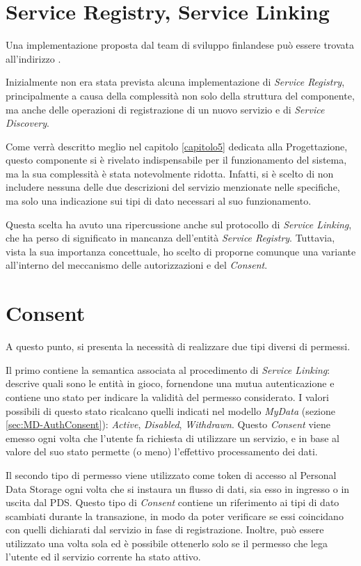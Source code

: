 \section{Service Registry, Service Linking}
Una implementazione proposta dal team di sviluppo finlandese pu\`o essere trovata all’indirizzo \cite{githubmydataserviceregistry}. 

Inizialmente non era stata prevista alcuna implementazione di \textit{Service Registry}, principalmente a causa della complessit\`a non solo della struttura del componente, ma anche delle operazioni di registrazione di un nuovo servizio e di \textit{Service Discovery}.

Come verr\`a descritto meglio nel capitolo \ref{capitolo5} dedicata alla Progettazione, questo componente si \`e rivelato indispensabile per il funzionamento del sistema, ma la sua complessit\`a \`e stata notevolmente ridotta. Infatti, si \`e scelto di non includere nessuna delle due descrizioni del servizio menzionate nelle specifiche, ma solo una indicazione sui tipi di dato necessari al suo funzionamento.

Questa scelta ha avuto una ripercussione anche sul protocollo di \textit{Service Linking}, che ha perso di significato in mancanza dell’entit\`a \textit{Service Registry}. Tuttavia, vista la sua importanza concettuale, ho scelto di proporne comunque una variante all’interno del meccanismo delle autorizzazioni e del \textit{Consent}.

\section{Consent}
\label{sec:A-Consent}
A questo punto, si presenta la necessit\`a di realizzare due tipi diversi di permessi.

Il primo contiene la semantica associata al procedimento di \textit{Service Linking}: descrive quali sono le entit\`a in gioco, fornendone una mutua autenticazione e contiene uno stato per indicare la validit\`a del permesso considerato. I valori possibili di questo stato ricalcano quelli indicati nel modello \textit{MyData} (sezione \ref{sec:MD-AuthConsent}): \textit{Active}, \textit{Disabled}, \textit{Withdrawn}. Questo \textit{Consent} viene emesso ogni volta che l’utente fa richiesta di utilizzare un servizio, e in base al valore del suo stato permette (o meno) l’effettivo processamento dei dati.

Il secondo tipo di permesso viene utilizzato come token di accesso al Personal Data Storage ogni volta che si instaura un flusso di dati, sia esso in ingresso o in uscita dal PDS. Questo tipo di \textit{Consent} contiene un riferimento ai tipi di dato scambiati durante la transazione, in modo da poter verificare se essi coincidano con quelli dichiarati dal servizio in fase di registrazione. Inoltre, pu\`o essere utilizzato una volta sola ed \`e possibile ottenerlo solo se il permesso che lega l’utente ed il servizio corrente ha stato attivo.

